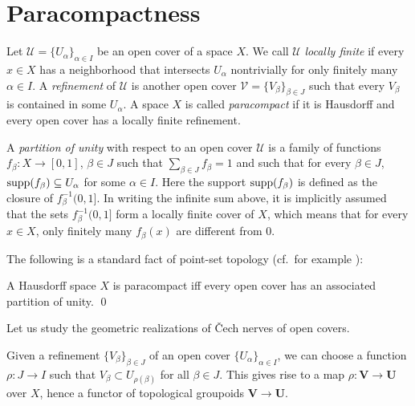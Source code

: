 \documentclass[a4paper,openany]{scrbook}
\begin{document}
\section{Paracompactness}\label{sec:paracompactness}

\begin{defn}
Let $\mathcal U = \{U_\alpha\}_{\alpha \in I}$ be an open cover of a space $X$. We call $\mathcal U$ \emph{locally finite} if every $x \in X$ has a neighborhood that intersects $U_\alpha$ nontrivially for only finitely many $\alpha \in I$. A \emph{refinement} of $\mathcal U$ is another open cover $\mathcal V = \{V_\beta\}_{\beta \in J}$ such that every $V_\beta$ is contained in some $U_\alpha$. A space $X$ is called \emph{paracompact} if it is Hausdorff and every open cover has a locally finite refinement.

A \emph{partition of unity} with respect to an open cover $\mathcal U$ is a family of functions $f_\beta\colon X \to [0,1]$, $\beta \in J$ such that $\sum_{\beta \in J} f_{\beta} = 1$ and such that for every $\beta \in J$, $\operatorname{supp}(f_\beta) \subseteq U_\alpha$ for some $\alpha \in I$. Here the support $\operatorname{supp}(f_\beta)$ is defined as the closure of $f_\beta^{-1}(0,1]$. In writing the infinite sum above, it is implicitly assumed that the sets $f_{\beta}^{-1}(0,1]$ form a locally finite cover of $X$, which means that for every $x \in X$, only finitely many $f_\beta(x)$ are different from $0$.
\end{defn}

The following is a standard fact of point-set topology (cf.\ for example \cite[Chapter~I.12]{bredon:topology-geometry}):

\begin{prop}
A Hausdorff space $X$ is paracompact iff every open cover has an associated partition of unity. \qed
\end{prop}

Let us study the geometric realizations of \v Cech nerves of open covers. 

Given a refinement $\{V_\beta\}_{\beta \in J}$ of an open cover $\{U_\alpha\}_{\alpha \in I}$, we can choose a function $\rho\colon J \to I$ such that $V_\beta \subset U_{\rho(\beta)}$ for all $\beta \in J$. This gives rise to a map $\rho\colon \mathbf V \to \mathbf U$ over $X$, hence a functor of topological groupoids $\mathbf V \to \mathbf U$.
\end{document}
